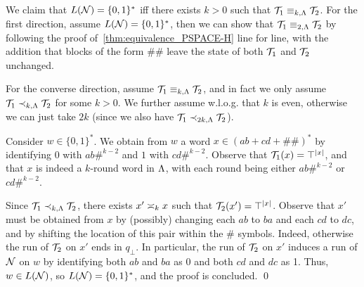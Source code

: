 We claim that $L(\cN)=\{0,1\}^*$ iff there exists $k>0$ such that $\cT_1\equiv_{k,\fL}\cT_2$.
For the first direction, assume $L(\cN)=\{0,1\}^*$, then we can show that $\cT_1\equiv_{2,\fL}\cT_2$ by following the proof of~\cref{thm:equivalence_PSPACE-H} line for line, with the addition that blocks of the form $\#\#$ leave the state of both $\cT_1$ and $\cT_2$ unchanged.

For the converse direction, assume $\cT_1\equiv_{k,\fL}\cT_2$, and in fact we only assume $\cT_1\prec_{k,\fL}\cT_2$ for some $k>0$. We further assume w.l.o.g.\! that $k$ is even, otherwise we can just take $2k$ (since we also have $\cT_1\prec_{2k,\fL}\cT_2$).

Consider $w\in \{0,1\}^*$. We obtain from $w$ a word $x\in (ab+cd+\#\#)^*$ by identifying $0$ with $ab\#^{k-2}$ and $1$ with $cd\#^{k-2}$. Observe that $\cT_1(x)=\top^{|x|}$, and that $x$ is indeed a $k$-round word in $\fL$, with each round being either $ab\#^{k-2}$ or $cd\#^{k-2}$. 

Since $\cT_1\prec_{k,\fL}\cT_2$, there exists $x'\req[k]x$ such that $\cT_2(x')=\top^{|x|}$. Observe that $x'$ must be obtained from $x$ by (possibly) changing each $ab$ to $ba$ and each $cd$ to $dc$, and by shifting the location of this pair within the $\#$ symbols. Indeed, otherwise the run of $\cT_2$ on $x'$ ends in $q_{\bot}$.
In particular, the run of $\cT_2$ on $x'$ induces a run of $\cN$ on $w$ by identifying both $ab$ and $ba$ as 0 and both $cd$ and $dc$ as 1. Thus, $w\in L(\cN)$, so $L(\cN)=\{0,1\}^*$, and the proof is concluded. \qed





